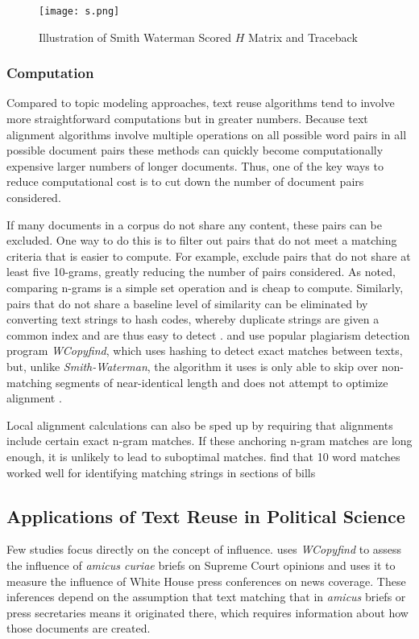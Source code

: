 \documentclass{article}
\begin{document}
\begin{figure}[!ht]
\centering
\caption{Illustration of Smith Waterman Scored $H$ Matrix and Traceback} %
\texttt{[image: s.png]}
\end{figure}

\subsubsection{Computation}
Compared to topic modeling approaches, text reuse algorithms tend to involve more straightforward computations but in greater numbers. Because text alignment algorithms involve multiple operations on all possible word pairs in all possible document pairs these methods can quickly become computationally expensive larger numbers of longer documents. Thus, one of the key ways to reduce computational cost is to cut down the number of document pairs considered. 

If many documents in a corpus do not share any content, these pairs can be excluded. One way to do this is to filter out pairs that do not meet a matching criteria that is easier to compute. For example, \citet{Wilkerson2015} exclude pairs that do not share at least five 10-grams, greatly reducing the number of pairs considered. As noted, comparing n-grams is a simple set operation and is cheap to compute. Similarly, pairs that do not share a baseline level of similarity can be eliminated by converting text strings to hash codes, whereby duplicate strings are given a common index and are thus easy to detect \citep{Huston2011}. \citet{Collins2015} and \citet{Eshbaugh-Soha2013} use popular plagiarism detection program \textit{WCopyfind}, which uses hashing to detect exact matches between texts, but, unlike\textit{ Smith-Waterman}, the algorithm it uses is only able to skip over non-matching segments of near-identical length and does not attempt to optimize alignment \citep{Bloomfield2011}. 

Local alignment calculations can also be sped up by requiring that alignments include certain exact n-gram matches. If these anchoring n-gram matches are long enough, it is unlikely to lead to suboptimal matches. \citet{Wilkerson2015} find that 10 word matches worked well for identifying matching strings in sections of bills


\subsection{Applications of Text Reuse in Political Science}
Few studies focus directly on the concept of influence. 
\citet{Collins2015} uses \textit{WCopyfind} to assess the influence of \textit{amicus curiae} briefs on Supreme Court opinions and \citet{Eshbaugh-Soha2013} uses it to measure the influence of White House press conferences on news coverage. These inferences depend on the assumption that text matching that in \textit{amicus} briefs or press secretaries means it originated there, which requires information about how those documents are created. 
\end{document}
